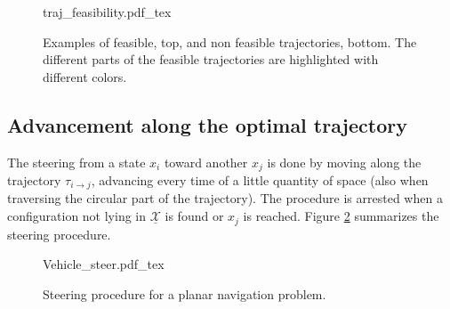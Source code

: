  \begin{figure}
	 \centering
 \def\svgwidth{0.65 \columnwidth}
 {traj_feasibility.pdf_tex} 
	 \caption{Examples of feasible, top, and non feasible trajectories, bottom. The different parts of the feasible trajectories are highlighted with different colors. }
 \label{fig:traj_feas}
 \end{figure}

\subsection{Advancement along the optimal trajectory}

The steering from a state $x_i$ toward another $x_j$ is done by moving along the trajectory $\tau_{i \rightarrow j}$, advancing every time of a little quantity of space (also when traversing the circular part of the trajectory).
The procedure is arrested when a configuration not lying in $\underline{\mathcal{X}}$ is found or $x_j$ is reached. Figure \ref{fig:vehicle_steer} summarizes the steering procedure.

 \begin{figure}
	 \centering
 \def\svgwidth{0.35 \columnwidth}
 {Vehicle_steer.pdf_tex} 
	 \caption{Steering procedure for a planar navigation problem.}
 \label{fig:vehicle_steer}
 \end{figure}

